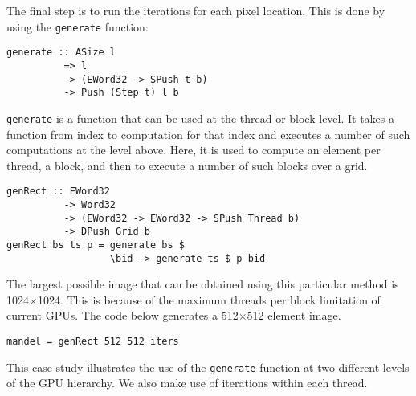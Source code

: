 The final step is to run the iterations for each pixel location. 
This is done by using the {\tt generate} function: 
\begin{small}
\begin{Verbatim}[samepage=true] 
generate :: ASize l 
          => l 
          -> (EWord32 -> SPush t b) 
          -> Push (Step t) l b
\end{Verbatim}
\end{small}

\noindent
{\tt generate} is a function that can be used at the thread or block level.
It takes a function from index to computation for that index and executes a 
number of such computations at the level above. Here, it is used to compute 
an element per thread, a block,  and then to execute a number of such blocks over a grid. 


\begin{small} 
\begin{verbatim} 
genRect :: EWord32
          -> Word32
          -> (EWord32 -> EWord32 -> SPush Thread b)
          -> DPush Grid b 
genRect bs ts p = generate bs $
                  \bid -> generate ts $ p bid 
\end{verbatim}
\end{small} %


The largest possible image that can be obtained using this particular 
method is 1024$\times$1024. This is because of the maximum threads per block 
limitation of current GPUs. The code below generates a 512$\times$512 element 
image. 
\begin{small} 
\begin{verbatim}
mandel = genRect 512 512 iters
\end{verbatim}
\end{small}

This case study illustrates the use of the {\tt generate} function at 
two different levels of the GPU hierarchy. We also make use of 
iterations within each thread.


